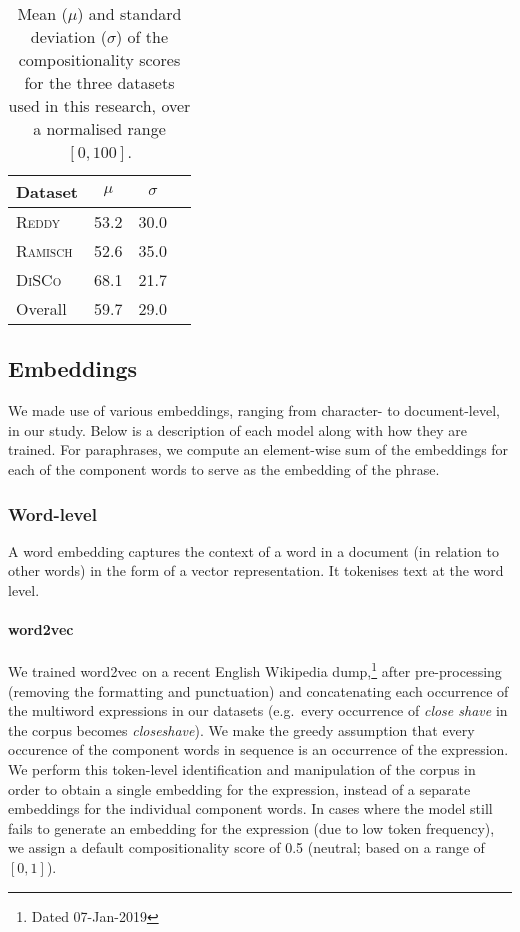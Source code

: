 \documentclass[11pt,a4paper]{article}
\newcommand{\embmethod}[2][]{\textsf{#2}$_{\text{#1}}$\xspace}
\newcommand{\wordtovec}{\embmethod{word2vec}}
\newcommand{\dataset}[2][]{\textsc{#2}$_{\text{#1}}$\xspace}
\newcommand{\reddy}{\dataset{Reddy}}
\newcommand{\ramisch}{\dataset{Ramisch}}
\newcommand{\discoj}[1][]{\dataset[#1]{DiSCo}}
\begin{document}
\begin{table}[t]
\begin{center}
\begin{tabular}{lSS@{\,}l}
  \toprule
  Dataset & $\mu$ & $\sigma$ \\
  \midrule
  \reddy & 53.2 & 30.0 \\
  \ramisch & 52.6 & 35.0 \\
  \discoj & 68.1 & 21.7 \\
  \midrule
  Overall & 59.7 & 29.0 \\
\bottomrule
\end{tabular}
\caption{Mean ($\mu$) and standard deviation ($\sigma$) of the compositionality scores for the three datasets used in this research, over a normalised range $[0,100]$.}
\label{tab:stats}
\end{center}
\end{table}

\subsection{Embeddings}
We made use of various embeddings, ranging from character- to document-level, in our study. Below is a description of each model along with how they are trained. 
For paraphrases, we compute an element-wise sum of the embeddings for each of the component words to serve as the embedding of the phrase.

\subsubsection{Word-level}
A word embedding captures the context of a word in a document (in relation to other words) in the form of a vector representation. It tokenises text at the word level.

\paragraph{\wordtovec}
We trained \wordtovec \cite{Mikolov2013b} on a recent English Wikipedia dump,\footnote{\label{wiki}Dated 07-Jan-2019} after pre-processing (removing the formatting and punctuation) and concatenating each occurrence of the multiword expressions in our datasets (e.g.\ every occurrence of \textit{close shave} in the corpus becomes \textit{closeshave}). We make the greedy assumption that every occurence of the component words in sequence is an occurrence of the expression. We perform this token-level identification and manipulation of the corpus in order to obtain a single embedding for the expression, instead of a separate embeddings for the individual component words. In cases where the model still fails to generate an embedding for the expression (due to low token frequency), we assign a default compositionality score of 0.5 (neutral; based on a range of $[0,1]$).
\end{document}
